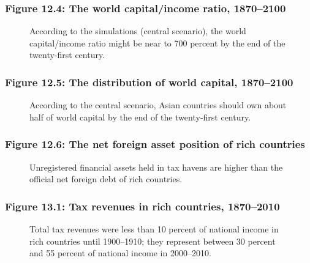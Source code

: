 \documentclass[t]{beamer}\usepackage[]{graphicx}\usepackage[]{color}
\begin{document}
\begin{frame}[label=Figure_12_4]
\frametitle{Figure 12.4: The world capital/income ratio, 1870--2100}
\begin{figure}[t]
\begin{minipage}[b]{\textwidth}
\centering

\caption{According to the simulations (central scenario), the world capital/income ratio might be near to 700 percent by the end of the twenty-first century.}
\end{minipage}
\end{figure}
\end{frame}


\begin{frame}[label=Figure_12_5]
\frametitle{Figure 12.5: The distribution of world capital, 1870--2100}
\begin{figure}[t]
\begin{minipage}[b]{\textwidth}
\centering

\caption{According to the central scenario, Asian countries should own about half of world capital by the end of the twenty-first century.} %
\end{minipage}
\end{figure}
\end{frame}


\begin{frame}[label=Figure_12_6]
\frametitle{Figure 12.6: The net foreign asset position of rich countries}
\begin{figure}[t]
\begin{minipage}[b]{\textwidth}
\centering

\caption{Unregistered financial assets held in tax havens are higher than the official net foreign debt of rich countries.}
\end{minipage}
\end{figure}
\end{frame}


\begin{frame}[label=Figure_13_1]
\frametitle{Figure 13.1: Tax revenues in rich countries, 1870--2010}
\begin{figure}[t]
\begin{minipage}[b]{\textwidth}
\centering

\caption{Total tax revenues were less than 10 percent of national income in rich countries until 1900--1910; they represent between 30 percent and 55 percent of national income in 2000--2010.}
\end{minipage}
\end{figure}
\end{frame}
\end{document}
